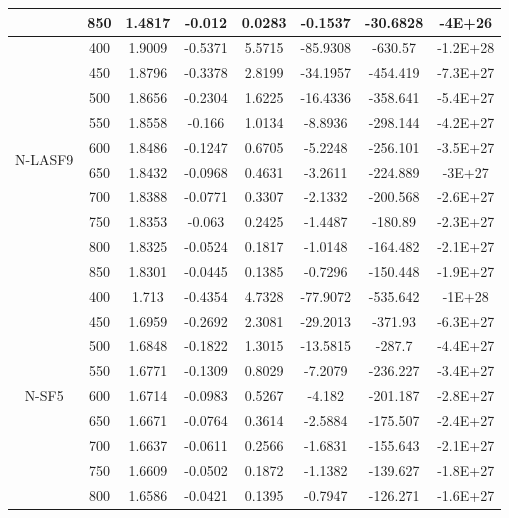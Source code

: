 {\begin{longtable}{cccccccc}
                          & 850 & 1.4817 & -0.012  & 0.0283 & -0.1537  & -30.6828 & -4E+26   \\ \hline
\multirow{10}{*}{N-LASF9} & 400 & 1.9009 & -0.5371 & 5.5715 & -85.9308 & -630.57  & -1.2E+28 \\
                          & 450 & 1.8796 & -0.3378 & 2.8199 & -34.1957 & -454.419 & -7.3E+27 \\
                          & 500 & 1.8656 & -0.2304 & 1.6225 & -16.4336 & -358.641 & -5.4E+27 \\
                          & 550 & 1.8558 & -0.166  & 1.0134 & -8.8936  & -298.144 & -4.2E+27 \\
                          & 600 & 1.8486 & -0.1247 & 0.6705 & -5.2248  & -256.101 & -3.5E+27 \\
                          & 650 & 1.8432 & -0.0968 & 0.4631 & -3.2611  & -224.889 & -3E+27   \\
                          & 700 & 1.8388 & -0.0771 & 0.3307 & -2.1332  & -200.568 & -2.6E+27 \\
                          & 750 & 1.8353 & -0.063  & 0.2425 & -1.4487  & -180.89  & -2.3E+27 \\
                          & 800 & 1.8325 & -0.0524 & 0.1817 & -1.0148  & -164.482 & -2.1E+27 \\
                          & 850 & 1.8301 & -0.0445 & 0.1385 & -0.7296  & -150.448 & -1.9E+27 \\ \hline
\multirow{10}{*}{N-SF5}   & 400 & 1.713  & -0.4354 & 4.7328 & -77.9072 & -535.642 & -1E+28   \\
                          & 450 & 1.6959 & -0.2692 & 2.3081 & -29.2013 & -371.93  & -6.3E+27 \\
                          & 500 & 1.6848 & -0.1822 & 1.3015 & -13.5815 & -287.7   & -4.4E+27 \\
                          & 550 & 1.6771 & -0.1309 & 0.8029 & -7.2079  & -236.227 & -3.4E+27 \\
                          & 600 & 1.6714 & -0.0983 & 0.5267 & -4.182   & -201.187 & -2.8E+27 \\
                          & 650 & 1.6671 & -0.0764 & 0.3614 & -2.5884  & -175.507 & -2.4E+27 \\
                          & 700 & 1.6637 & -0.0611 & 0.2566 & -1.6831  & -155.643 & -2.1E+27 \\
                          & 750 & 1.6609 & -0.0502 & 0.1872 & -1.1382  & -139.627 & -1.8E+27 \\
                          & 800 & 1.6586 & -0.0421 & 0.1395 & -0.7947  & -126.271 & -1.6E+27 \\

\end{longtable}}
